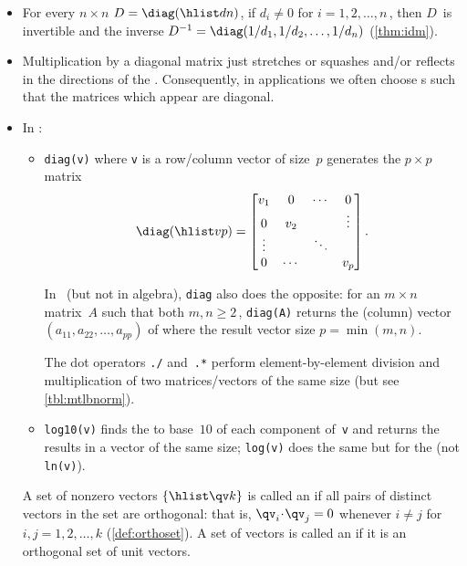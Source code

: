 \begin{itemize}
\item For every \(n\times n\)   \(D=\diag(\hlist dn)\), 
if  \(d_{i}\neq 0\) for \(i=1,2,\ldots,n\)\,, then \(D\)~is {invertible} and the inverse \(D^{-1}=\diag(1/d_{1},1/d_{2},\ldots,1/d_{n})\) (\cref{thm:idm}).

\item Multiplication by a diagonal matrix just stretches or squashes and/or reflects in the directions of the .
Consequently, in applications we often choose s such that the matrices which appear are diagonal.

\item In \script:
\begin{itemize}
\item {}\verb|diag(v)| where \verb|v| is 
a row/column vector of size~\(p\) generates the \(p\times p\) matrix 
\begin{equation*}
\diag(\hlist vp)=\begin{bmatrix} v_1&0&\cdots&0\\
0&v_2&&\vdots\\ \vdots&&\ddots\\ 0&\cdots&&v_p \end{bmatrix}.
\end{equation*}

\itemhi In \script\ (but not in algebra), \verb|diag| also does the 
opposite: for an \(m\times n\) matrix~\(A\) such that both 
\(m,n\geq2\)\,,  \verb|diag(A)| returns 
the (column) vector \((a_{11},a_{22},\ldots,a_{pp})\) of 
 where the result vector size \(p=\min(m,n)\).

\itemhi The dot operators \verb|./| and~\verb|.*| perform element-by-element division and multiplication of two matrices\slash vectors of the same size (but see \cref{tbl:mtlbnorm}).

\item \verb|log10(v)| finds the  to base~\(10\) of each component of~\verb|v| and returns the results in a vector of the same size; \verb|log(v)| does the same but for the  (not \verb|ln(v)|).

\end{itemize}



\itemhi A set of nonzero vectors \(\{\hlist\qv k\}\) is called an  if all pairs of distinct vectors in the set are {orthogonal}: that is, \(\qv_i\cdot\qv_j=0\) whenever \(i\neq j\) for \(i,j=1,2,\ldots,k\) (\cref{def:orthoset}).
A set of vectors is called an  if it is an {orthogonal set} of {unit vector}s.


\end{itemize}
